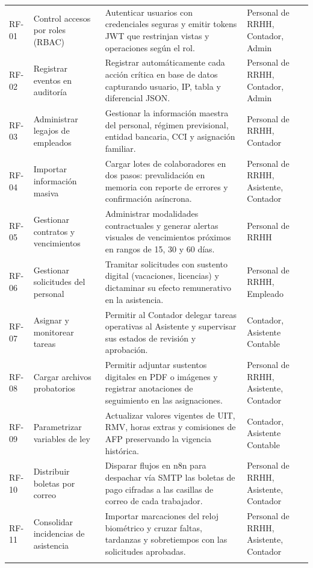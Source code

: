 {\begin{longtable}{@{}p{1.5cm}p{3.8cm}p{7.1cm}p{2.8cm}@{}}
        RF-01 & Control accesos por roles (RBAC) & Autenticar usuarios con credenciales seguras y emitir tokens JWT que restrinjan vistas y operaciones según el rol. & Personal de RRHH, Contador, Admin \\ \addlinespace
        RF-02 & Registrar eventos en auditoría & Registrar automáticamente cada acción crítica en base de datos capturando usuario, IP, tabla y diferencial JSON. & Personal de RRHH, Contador, Admin \\ \addlinespace
        RF-03 & Administrar legajos de empleados & Gestionar la información maestra del personal, régimen previsional, entidad bancaria, CCI y asignación familiar. & Personal de RRHH, Contador \\ \addlinespace
        RF-04 & Importar información masiva & Cargar lotes de colaboradores en dos pasos: prevalidación en memoria con reporte de errores y confirmación asíncrona. & Personal de RRHH, Asistente, Contador \\ \addlinespace
        RF-05 & Gestionar contratos y vencimientos & Administrar modalidades contractuales y generar alertas visuales de vencimientos próximos en rangos de 15, 30 y 60 días. & Personal de RRHH \\ \addlinespace
        RF-06 & Gestionar solicitudes del personal & Tramitar solicitudes con sustento digital (vacaciones, licencias) y dictaminar su efecto remunerativo en la asistencia. & Personal de RRHH, Empleado \\ \addlinespace
        RF-07 & Asignar y monitorear tareas & Permitir al Contador delegar tareas operativas al Asistente y supervisar sus estados de revisión y aprobación. & Contador, Asistente Contable \\ \addlinespace
        RF-08 & Cargar archivos probatorios & Permitir adjuntar sustentos digitales en PDF o imágenes y registrar anotaciones de seguimiento en las asignaciones. & Personal de RRHH, Asistente, Contador \\ \addlinespace
        RF-09 & Parametrizar variables de ley & Actualizar valores vigentes de UIT, RMV, horas extras y comisiones de AFP preservando la vigencia histórica. & Contador, Asistente Contable \\ \addlinespace
        RF-10 & Distribuir boletas por correo & Disparar flujos en n8n para despachar vía SMTP las boletas de pago cifradas a las casillas de correo de cada trabajador. & Personal de RRHH, Asistente, Contador \\ \addlinespace
        RF-11 & Consolidar incidencias de asistencia & Importar marcaciones del reloj biométrico y cruzar faltas, tardanzas y sobretiempos con las solicitudes aprobadas. & Personal de RRHH, Asistente, Contador \\ \addlinespace

\end{longtable}}
